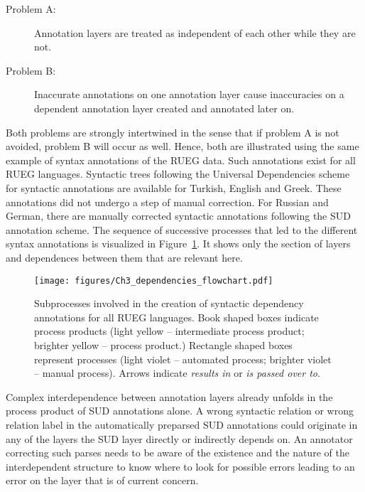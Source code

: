 \documentclass[output=paper,colorlinks,citecolor=brown]{langscibook}
\begin{document}
\begin{description}
	\item[Problem A:] Annotation layers are treated as independent of each other while they are not. 
	\item[Problem B:] Inaccurate annotations on one annotation layer cause inaccuracies on a dependent annotation layer created and annotated later on.
\end{description}

Both problems are strongly intertwined in the sense that if problem A is not avoided, problem B will occur as well. Hence, both are illustrated using the same example of syntax annotations of the RUEG data. Such annotations exist for all RUEG languages. Syntactic trees following the Universal Dependencies scheme for syntactic annotations \parencite[UD; ][]{UD} are available for Turkish, English and Greek. These annotations did not undergo a step of manual correction. For Russian and German, there are manually corrected syntactic annotations following the SUD annotation scheme. The sequence of successive processes that led to the different syntax annotations is visualized in Figure~\ref{fig:shadrovaetal:dependencies_flowchart}. It shows only the section of layers and dependences between them that are relevant here. 

\begin{figure}[hp]
    \texttt{[image: figures/Ch3\_dependencies\_flowchart.pdf]}
    \caption{Subprocesses involved in the creation of syntactic dependency annotations for all RUEG languages. Book shaped boxes indicate process products (light yellow -- intermediate process product; brighter yellow -- process product.) Rectangle shaped boxes represent processes (light violet -- automated process; brighter violet -- manual process). Arrows indicate \textit{results in} or \textit{is passed over to}.}
    \label{fig:shadrovaetal:dependencies_flowchart}
\end{figure}

Complex interdependence between annotation layers already unfolds in the process product of SUD annotations alone. A wrong syntactic relation or wrong relation label in the automatically preparsed SUD annotations could originate in any of the layers the SUD layer directly or indirectly depends on. An annotator correcting such parses needs to be aware of the existence and the nature of the interdependent structure to know where to look for possible errors leading to an error on the layer that is of current concern.
\end{document}
